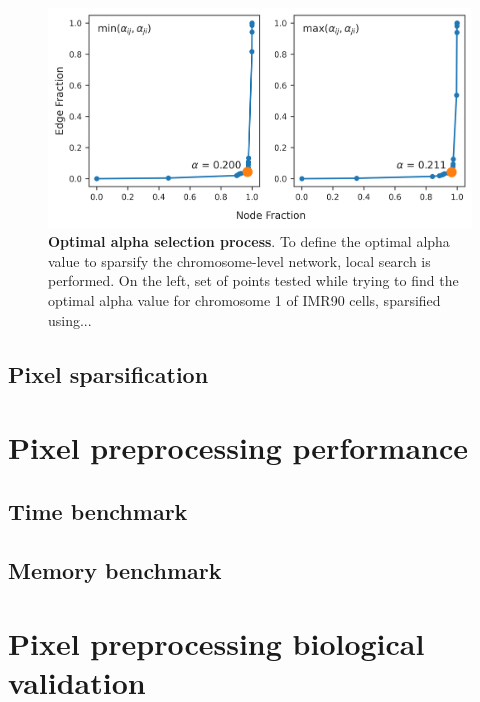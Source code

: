 \begin{figure}[h]
  \centering
  \includegraphics[width=1\textwidth]{alpha_tables.png}
  \caption{\textbf{Optimal alpha selection process}. To define the optimal alpha value to sparsify the chromosome-level network, local search is performed. On the left, set of points tested while trying to find the optimal alpha value for chromosome 1 of IMR90 cells, sparsified using... }
  \label{fig:alphas}
\end{figure}

\subsection{Pixel sparsification}


\section{Pixel preprocessing performance}

\subsection{Time benchmark}
\subsection{Memory benchmark}

\section{Pixel preprocessing biological validation}

